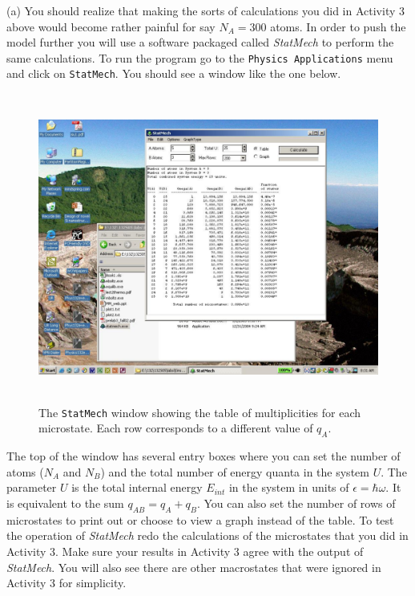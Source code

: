 (a) You should realize that making the sorts of calculations you did in Activity 3 above would
become rather painful for say $N_A = 300$ atoms.
In order to push the model further you will use a software packaged called 
{\it StatMech} to perform the same calculations.
To run the program go to the {\tt Physics Applications} menu and click on
{\tt StatMech}.
You should see a window like the one below.
\begin{figure}[!ht]
\begin{center}
\includegraphics[height=4.0in]{einstein_solid/statmech1.pdf}
\caption{The {\tt StatMech} window showing the table of multiplicities for each microstate.
Each row corresponds to a different value of $q_A$.}
\end{center}
\end{figure}
The top of the window has several entry boxes where you can set the number of
atoms ($N_A$ and $N_B$) and the total number of energy quanta in the system $U$.
The parameter $U$ is the total internal energy $E_{int}$ in the system in 
units of $\epsilon = \hbar \omega$.
It is equivalent to the sum $q_{AB} = q_A + q_B$.
You can also set the number of rows of microstates to print out
or choose to view a graph instead of the table.
To test the operation of {\it StatMech} redo the calculations of the microstates that
you did in Activity 3. Make sure your results in Activity 3 agree with the output of 
{\it StatMech}.
You will also see there are other macrostates that were ignored in Activity 3 for
simplicity.

